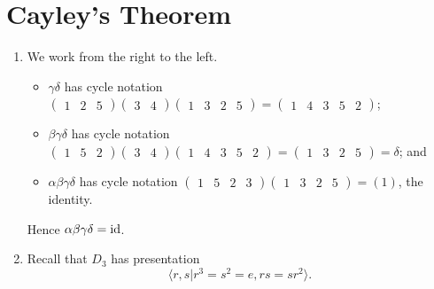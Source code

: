 \section{Cayley's Theorem}
\begin{enumerate}
    \item We work from the right to the left.
    \begin{itemize}
        \item $\gamma \delta$ has cycle notation $\begin{pmatrix}1 & 2 & 5\end{pmatrix}\begin{pmatrix}3 & 4\end{pmatrix}\begin{pmatrix}1 & 3 & 2 & 5\end{pmatrix} = \begin{pmatrix}1 & 4 & 3 & 5 & 2\end{pmatrix}$;
        \item $\beta \gamma \delta$ has cycle notation $\begin{pmatrix}1 & 5 & 2\end{pmatrix}\begin{pmatrix}3 & 4\end{pmatrix}\begin{pmatrix}1 & 4 & 3 & 5 & 2\end{pmatrix} = \begin{pmatrix}1 & 3 & 2 & 5\end{pmatrix} = \delta$; and
        \item $\alpha \beta \gamma \delta$ has cycle notation $\begin{pmatrix}1 & 5 & 2 & 3\end{pmatrix}\begin{pmatrix}1 & 3 & 2 & 5\end{pmatrix} = (1)$, the identity.
    \end{itemize}
    Hence $\alpha \beta \gamma \delta = \mathrm{id}$.

    \item Recall that $D_3$ has presentation
    \[
        \langle r, s \vert r^3 = s^2 = e, rs = sr^2 \rangle.
    \]


\end{enumerate}
